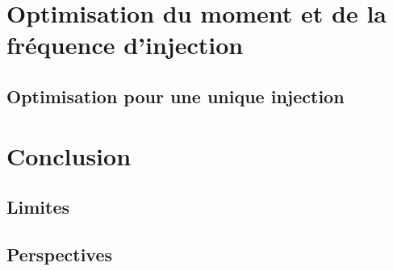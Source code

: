 \documentclass[12pt]{article}
\begin{document}
\section{Optimisation du moment et de la fréquence d'injection}
\subsection{Optimisation pour une unique injection}

\section{Conclusion}
\subsection{Limites}
\subsection{Perspectives}


\printbibliography  %
\end{document}
